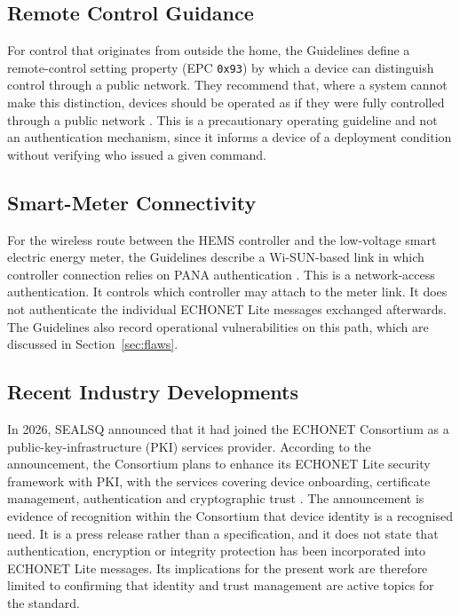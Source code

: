 \subsection{Remote Control Guidance}

For control that originates from outside the home, the Guidelines define a remote-control setting property (EPC \texttt{0x93}) by which a device can distinguish control through a public network. They recommend that, where a system cannot make this distinction, devices should be operated as if they were fully controlled through a public network \cite{ECHONETGuidelines}. This is a precautionary operating guideline and not an authentication mechanism, since it informs a device of a deployment condition without verifying who issued a given command.

\subsection{Smart-Meter Connectivity}

For the wireless route between the HEMS controller and the low-voltage smart electric energy meter, the Guidelines describe a Wi-SUN-based link in which controller connection relies on PANA authentication \cite{ECHONETGuidelines}. This is a network-access authentication. It controls which controller may attach to the meter link. It does not authenticate the individual ECHONET Lite messages exchanged afterwards. The Guidelines also record operational vulnerabilities on this path, which are discussed in Section~\ref{sec:flaws}.

\subsection{Recent Industry Developments}

In 2026, SEALSQ announced that it had joined the ECHONET Consortium as a public-key-infrastructure (PKI) services provider. According to the announcement, the Consortium plans to enhance its ECHONET Lite security framework with PKI, with the services covering device onboarding, certificate management, authentication and cryptographic trust \cite{SEALSQ2026}. The announcement is evidence of recognition within the Consortium that device identity is a recognised need. It is a press release rather than a specification, and it does not state that authentication, encryption or integrity protection has been incorporated into ECHONET Lite messages. Its implications for the present work are therefore limited to confirming that identity and trust management are active topics for the standard.

